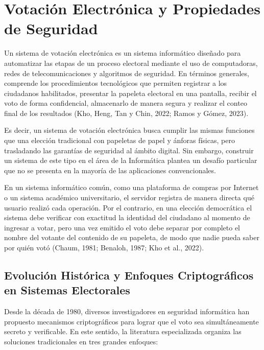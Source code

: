 \section{Votación Electrónica y Propiedades de Seguridad}

Un sistema de votación electrónica es un sistema informático diseñado para automatizar las etapas de un proceso electoral mediante el uso de computadoras, redes de telecomunicaciones y algoritmos de seguridad. En términos generales, comprende los procedimientos tecnológicos que permiten registrar a los ciudadanos habilitados, presentar la papeleta electoral en una pantalla, recibir el voto de forma confidencial, almacenarlo de manera segura y realizar el conteo final de los resultados (Kho, Heng, Tan y Chin, 2022; Ramos y Gómez, 2023).

Es decir, un sistema de votación electrónica busca cumplir las mismas funciones que una elección tradicional con papeletas de papel y ánforas físicas, pero trasladando las garantías de seguridad al ámbito digital. Sin embargo, construir un sistema de este tipo en el área de la Informática plantea un desafío particular que no se presenta en la mayoría de las aplicaciones convencionales.

En un sistema informático común, como una plataforma de compras por Internet o un sistema académico universitario, el servidor registra de manera directa qué usuario realizó cada operación. Por el contrario, en una elección democrática el sistema debe verificar con exactitud la identidad del ciudadano al momento de ingresar a votar, pero una vez emitido el voto debe separar por completo el nombre del votante del contenido de su papeleta, de modo que nadie pueda saber por quién votó (Chaum, 1981; Benaloh, 1987; Kho et al., 2022).

\subsection{Evolución Histórica y Enfoques Criptográficos en Sistemas Electorales}

Desde la década de 1980, diversos investigadores en seguridad informática han propuesto mecanismos criptográficos para lograr que el voto sea simultáneamente secreto y verificable. En este sentido, la literatura especializada organiza las soluciones tradicionales en tres grandes enfoques:


